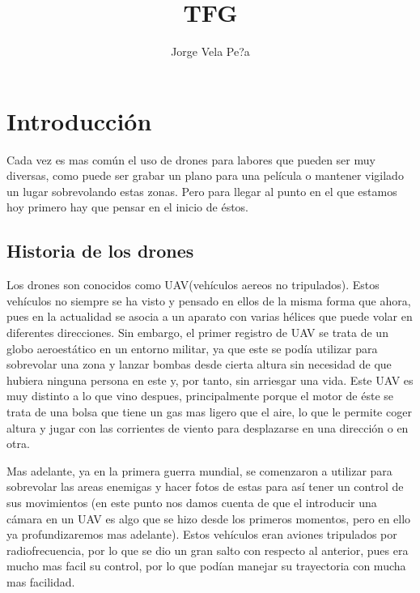 \documentclass{article}
\title{TFG}
\author{Jorge Vela Pe?a}
\begin{document}

\maketitle



\newpage

\section{Introducci\'on}
Cada vez es mas com\'un el uso de drones para labores que pueden ser muy diversas, como puede ser grabar un plano para una pel\'icula o mantener vigilado un lugar sobrevolando estas zonas. Pero para llegar al punto en el que estamos hoy primero hay que pensar en el inicio de \'estos. 

\subsection{Historia de los drones}
\hspace{1 cm} Los drones son conocidos como UAV(veh\'iculos aereos no tripulados). Estos veh\'iculos no siempre se ha visto y pensado en ellos de la misma forma que ahora, pues en la actualidad se asocia a un aparato con varias h\'elices que puede volar en diferentes direcciones. Sin embargo, el primer registro de UAV se trata de un globo aeroest\'atico en un entorno militar, ya que este se pod\'ia utilizar para sobrevolar una zona y lanzar bombas desde cierta altura sin necesidad de que hubiera ninguna persona en este y, por tanto, sin arriesgar una vida. Este UAV es muy distinto a lo que vino despues, principalmente porque el motor de \'este se trata de una bolsa que tiene un gas mas ligero que el aire, lo que le permite coger altura y jugar con las corrientes de viento para desplazarse en una direcci\'on o en otra. 

\hspace{1 cm} Mas adelante, ya en la primera guerra mundial, se comenzaron a utilizar para sobrevolar las areas enemigas y hacer fotos de estas para as\'i tener un control de sus movimientos (en este punto nos damos cuenta de que el introducir una c\'amara en un UAV es algo que se hizo desde los primeros momentos, pero en ello ya profundizaremos mas adelante). Estos veh\'iculos eran aviones tripulados por radiofrecuencia, por lo que se dio un gran salto con respecto al anterior, pues era mucho mas facil su control, por lo que pod\'ian manejar su trayectoria con mucha mas facilidad. 
\end{document}
